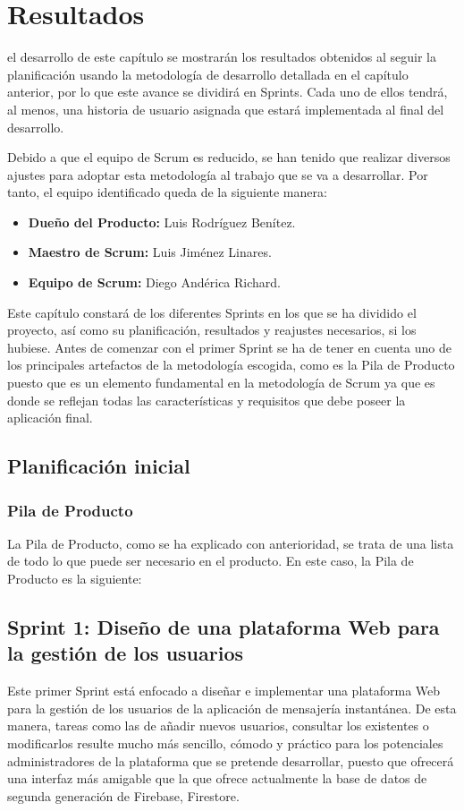 \chapter{Resultados}
\label{chap:resultados}

 el desarrollo de este capítulo se mostrarán los resultados obtenidos al seguir la planificación usando la metodología de desarrollo detallada en el capítulo anterior, por lo que este avance se dividirá en Sprints. Cada uno de ellos tendrá, al menos, una historia de usuario asignada que estará implementada al final del desarrollo.

Debido a que el equipo de Scrum es reducido, se han tenido que realizar diversos ajustes para adoptar esta metodología al trabajo que se va a desarrollar. Por tanto, el equipo identificado queda de la siguiente manera:

\begin{itemize}
	\item \textbf{Dueño del Producto:} Luis Rodríguez Benítez.
	\item \textbf{Maestro de Scrum:} Luis Jiménez Linares.
	\item \textbf{Equipo de Scrum:} Diego Andérica Richard.
\end{itemize}

Este capítulo constará de los diferentes Sprints en los que se ha dividido el proyecto, así como su planificación, resultados y reajustes necesarios, si los hubiese. Antes de comenzar con el primer Sprint se ha de tener en cuenta uno de los principales artefactos de la metodología escogida, como es la Pila de Producto puesto que es un elemento fundamental en la metodología de Scrum ya que es donde se reflejan todas las características y requisitos que debe poseer la aplicación final.

\section{Planificación inicial}
\subsection{Pila de Producto}
La Pila de Producto, como se ha explicado con anterioridad, se trata de una lista de todo lo que puede ser necesario en el producto. En este caso, la Pila de Producto es la siguiente:

\section{Sprint 1: Diseño de una plataforma Web para la gestión de los usuarios}
Este primer Sprint está enfocado a diseñar e implementar una plataforma Web para la gestión de los usuarios de la aplicación de mensajería instantánea. De esta manera, tareas como las de añadir nuevos usuarios, consultar los existentes o modificarlos resulte mucho más sencillo, cómodo y práctico para los potenciales administradores de la plataforma que se pretende desarrollar, puesto que ofrecerá una interfaz más amigable que la que ofrece actualmente la base de datos de segunda generación de Firebase, Firestore.

